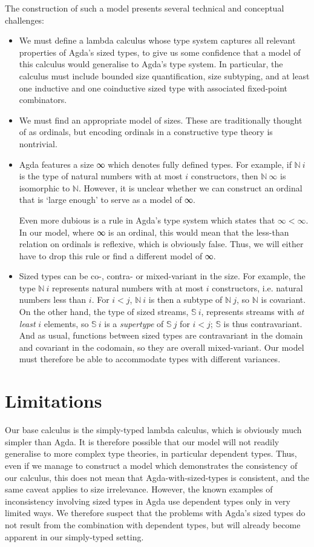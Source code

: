 \documentclass{scrartcl}
\begin{document}
The construction of such a model presents several technical and conceptual
challenges:
\begin{itemize}
\item We must define a lambda calculus whose type system captures all relevant
  properties of Agda's sized types, to give us some confidence that a model of
  this calculus would generalise to Agda's type system. In particular, the
  calculus must include bounded size quantification, size subtyping, and at least
  one inductive and one coinductive sized type with associated fixed-point
  combinators.
\item We must find an appropriate model of sizes. These are traditionally
  thought of as ordinals, but encoding ordinals in a constructive type theory
  is nontrivial.
\item Agda features a size ∞ which denotes fully defined types. For example, if
  $ℕ~i$ is the type of natural numbers with at most $i$ constructors, then $ℕ~∞$
  is isomorphic to $ℕ$. However, it is unclear whether we can construct an
  ordinal that is \enquote*{large enough} to serve as a model of ∞.

  Even more dubious is a rule in Agda's type system which states that $∞ < ∞$.
  In our model, where ∞ is an ordinal, this would mean that the less-than
  relation on ordinals is reflexive, which is obviously false. Thus, we will
  either have to drop this rule or find a different model of ∞.
\item Sized types can be co-, contra- or mixed-variant in the size. For example,
  the type $ℕ~i$ represents natural numbers with at most $i$ constructors, i.e.
  natural numbers less than $i$. For $i < j$, $ℕ~i$ is then a subtype of $ℕ~j$,
  so $ℕ$ is covariant. On the other hand, the type of sized streams, $𝕊~i$,
  represents streams with \emph{at least} $i$ elements, so $𝕊~i$ is a
  \emph{supertype} of $𝕊~j$ for $i < j$; $𝕊$ is thus contravariant. And as
  usual, functions between sized types are contravariant in the domain and
  covariant in the codomain, so they are overall mixed-variant. Our model must
  therefore be able to accommodate types with different variances.
\end{itemize}


\section{Limitations}

Our base calculus is the simply-typed lambda calculus, which is obviously much
simpler than Agda. It is therefore possible that our model will not readily
generalise to more complex type theories, in particular dependent types. Thus,
even if we manage to construct a model which demonstrates the consistency of our
calculus, this does not mean that Agda-with-sized-types is consistent, and the
same caveat applies to size irrelevance. However, the known examples of
inconsistency involving sized types in Agda use dependent types only in very
limited ways. We therefore suspect that the problems with Agda's sized types do
not result from the combination with dependent types, but will already become
apparent in our simply-typed setting.
\end{document}
